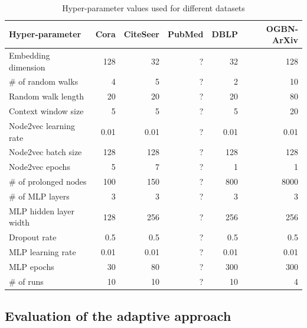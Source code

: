 \begin{table}
  \caption{Hyper-parameter values used for different datasets}
  \label{tab:hyperparameter-values}
  \begin{tabular}{lrrrrr}
    \toprule
    Hyper-parameter        & Cora & CiteSeer & PubMed & DBLP & OGBN-ArXiv \\
    \midrule
    Embedding dimension    & 128  & 32       & ?      & 32   & 128        \\
    \# of random walks     & 4    & 5        & ?      & 2    & 10         \\
    Random walk length     & 20   & 20       & ?      & 20   & 80         \\
    Context window size    & 5    & 5        & ?      & 5    & 20         \\
    Node2vec learning rate & 0.01 & 0.01     & ?      & 0.01 & 0.01       \\
    Node2vec batch size    & 128  & 128      & ?      & 128  & 128        \\
    Node2vec epochs        & 5    & 7        & ?      & 1    & 1          \\
    \# of prolonged nodes  & 100  & 150      & ?      & 800  & 8000       \\
    \# of MLP layers       & 3    & 3        & ?      & 3    & 3          \\
    MLP hidden layer width & 128  & 256      & ?      & 256  & 256        \\
    Dropout rate           & 0.5  & 0.5      & ?      & 0.5  & 0.5        \\
    MLP learning rate      & 0.01 & 0.01     & ?      & 0.01 & 0.01       \\
    MLP epochs             & 30   & 80       & ?      & 300  & 300        \\
    \# of runs             & 10   & 10       & ?      & 10   & 4          \\
    \bottomrule
  \end{tabular}
\end{table}

\subsection{Evaluation of the adaptive approach}


